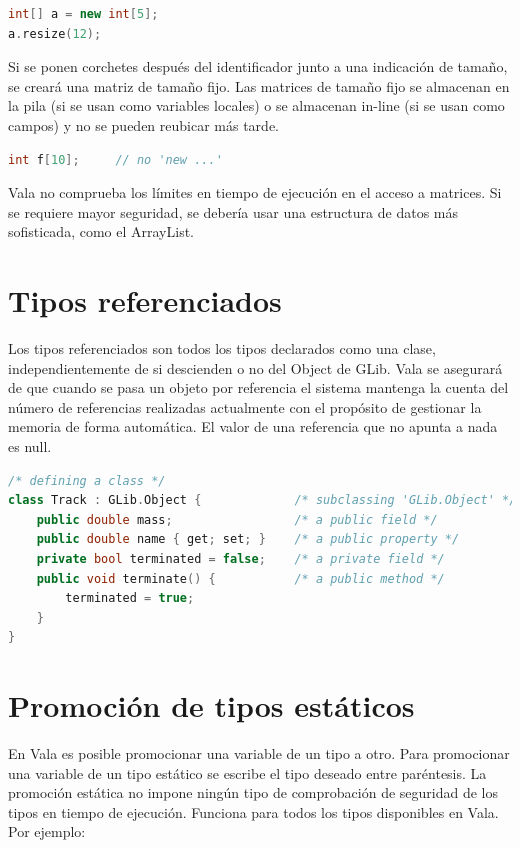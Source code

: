 \documentclass[12pt,twoside]{book}
\begin{document}
\begin{lstlisting}[language=C++]
int[] a = new int[5];
a.resize(12);
\end{lstlisting}

Si se ponen corchetes después del identificador junto a una indicación de tamaño, se creará una matriz de tamaño fijo. Las matrices de tamaño fijo se almacenan en la pila (si se usan como variables locales) o se almacenan in-line (si se usan como campos) y no se pueden reubicar más tarde.

\begin{lstlisting}[language=C++]
int f[10];     // no 'new ...'
\end{lstlisting}

Vala no comprueba los límites en tiempo de ejecución en el acceso a matrices. Si se requiere mayor seguridad, se debería usar una estructura de datos más sofisticada, como el ArrayList.

\section{Tipos referenciados}

Los tipos referenciados son todos los tipos declarados como una clase, independientemente de si descienden o no del Object de GLib. Vala se asegurará de que cuando se pasa un objeto por referencia el sistema mantenga la cuenta del número de referencias realizadas actualmente con el propósito de gestionar la memoria de forma automática. El valor de una referencia que no apunta a nada es null.

\begin{lstlisting}[language=C++]
/* defining a class */
class Track : GLib.Object {             /* subclassing 'GLib.Object' */
	public double mass;                 /* a public field */
	public double name { get; set; }    /* a public property */
	private bool terminated = false;    /* a private field */
	public void terminate() {           /* a public method */
		terminated = true;
	}
}
\end{lstlisting}

\section{Promoción de tipos estáticos}

En Vala es posible promocionar una variable de un tipo a otro. Para promocionar una variable de un tipo estático se escribe el tipo deseado entre paréntesis. La promoción estática no impone ningún tipo de comprobación de seguridad de los tipos en tiempo de ejecución. Funciona para todos los tipos disponibles en Vala. Por ejemplo:
\end{document}
